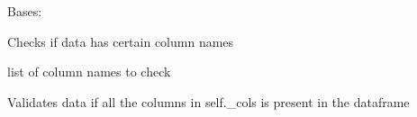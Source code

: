 \documentclass[letterpaper,10pt,english]{sphinxmanual}
\begin{document}
\begin{fulllineitems}
\label{\detokenize{dalio.validator:dalio.validator.pandas_val.HAS_COLS}}
Bases: {\hyperref[\detokenize{dalio.validator:dalio.validator.pandas_val.IS_PD_DF}]{}}

Checks if data has certain column names

\begin{fulllineitems}
\label{\detokenize{dalio.validator:dalio.validator.pandas_val.HAS_COLS._cols}}
list of column names to check

\end{fulllineitems}


\begin{fulllineitems}
\label{\detokenize{dalio.validator:dalio.validator.pandas_val.HAS_COLS.validate}}
Validates data if all the columns in self.\_cols is present in the
dataframe

\end{fulllineitems}


\end{fulllineitems}

\end{document}
